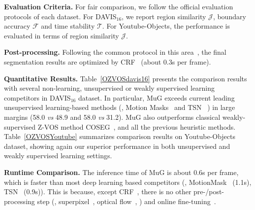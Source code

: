 \documentclass[10pt,twocolumn,letterpaper]{article}
\begin{document}
\noindent\textbf{Evaluation Criteria.}  For fair comparison, we follow the official
evaluation protocols of each dataset. For DAVIS$_{16}$, we report region similarity $\mathcal{J}$, boundary accuracy $\mathcal{F}$ and time stability $\mathcal{T}$.  For Youtube-Objects,  the performance is evaluated in terms of region similarity $\mathcal{J}$.

\noindent\textbf{Post-processing.} Following the common protocol in this area~\!\cite{DBLP:conf/iccv/TokmakovAS17,Song_2018_ECCV,cheng2017segflow},  the final segmentation results are optimized by CRF~\!\cite{krahenbuhl2011efficient}  (about 0.3s per frame).

\noindent\textbf{Quantitative Results.} 	Table~\!\ref{OZVOSdavis16} presents the comparison results with several  non-learning, unsupervised or weakly supervised learning competitors in DAVIS$_{16}$ dataset. In particular, MuG exceeds current leading unsupervised learning-based methods (\ie, Motion Masks~\!\cite{pathak2017learning} and TSN~\!\cite{croitoru2017unsupervised} ) in large margins (58.0 \textit{vs} 48.9 and 58.0 \textit{vs} 31.2). MuG also outperforms classical weakly-supervised Z-VOS method COSEG~\!\cite{tsai2016semantic}, and all the previous heuristic methods.  Table~\!\ref{OZVOSYoutube} summarizes comparison results on Youtube-Objects dataset, showing again our superior performance in both unsupervised and weakly supervised learning settings. 

\noindent\textbf{Runtime Comparison.} The inference time of MuG is about 0.6s per frame, which is faster than most deep learning based competitors (\eg, MotionMask~\!\cite{pathak2017learning} (1.1s), TSN~\!\cite{croitoru2017unsupervised} (0.9s)). This is because, except CRF~\!\cite{krahenbuhl2011efficient}, there is no other pre-/post-processing step (\eg, superpixel~\!\cite{tsai2016semantic}, optical flow~\!\cite{DBLP:conf/iccv/PapazoglouF13}, \etc) and online fine-tuning~\!\cite{DBLP:conf/cvpr/KohK17}.
\end{document}
